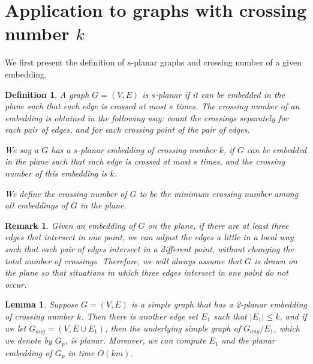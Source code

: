 \documentclass[10pt,fleqn]{article}
\newtheorem{lemma}[theorem]{Lemma}
\newtheorem{definition}[theorem]{Definition}
\newtheorem{remark}[theorem]{Remark}
\begin{document}
	\section{Application to graphs with crossing number $k$}\label{s7}
	We first present the definition of $s$-planar graphs \cite{111} and crossing number of a given embedding.
	\begin{definition}
		A graph $G=(V,E)$ is $s$-planar if it can be embedded in the plane such that each edge is crossed at most $s$ times. The crossing number of an embedding is obtained in the following way: count the crossings separately for each pair of edges, and for each crossing point of the pair of edges. \par
		We say a $G$ has a $s$-planar embedding of crossing number $k$, if $G$ can be embedded in the plane such that each edge is crossed at most $s$ times, and the crossing number of this embedding is $k$. \par
		We define the crossing number of $G$ to be the minimum crossing number among all embeddings of $G$ in the plane.
	\end{definition}
	\begin{remark}
		Given an embedding of $G$ on the plane, if there are at least three edges that intersect in one point, we can adjust the edges a little in a local way such that each pair of edges intersect in a different point, without changing the total number of crossings. Therefore, we will always assume that $G$ is drawn on the plane so that situations in which three edges intersect in one point do not occur.
	\end{remark}
	\begin{lemma}\label{lem71}
		Suppose $G=(V,E)$ is a simple graph that has a 2-planar embedding of crossing number $k$. Then there is another edge set $E_1$ such that $|E_1|\leq k$, and if we let $G_{aug}=(V,E\cup E_1)$, then the underlying simple graph of $G_{aug}/E_1$, which we denote by $G_p$, is planar. Moreover, we can compute $E_1$ and the planar embedding of $G_p$ in time $O(km)$.
	\end{lemma}
\end{document}
